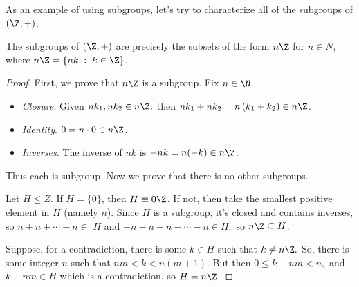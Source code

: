 As an example of using subgroups, let's try to characterize all of the subgroups of $(\Z, +)$.

\begin{theorem}[Subgroups of $\Z$]\label{thm:subgroups-of-z}
	The subgroups of $(\Z, +)$ are precisely the subsets of the form $n \Z$ for $n \in N$, where $n\Z = \{n k \; : \; k \in \Z\}$.
\end{theorem}
\begin{proof}
	First, we prove that $n \Z$ is a subgroup. Fix $n \in \N$.
	\begin{itemize}
		\item \emph{Closure}. Given $n k_{1}, n k_{2} \in n \Z,$ then $n k_{1}+n k_{2}=n\left(k_{1}+k_{2}\right) \in n \Z$.
		\item \emph{Identity}. $0 =n \cdot 0 \in n \Z$.
		\item \emph{Inverses}. The inverse of $n k$ is $-n k=n(-k) \in n \Z$.
	\end{itemize}
Thus each is subgroup. Now we prove that there is no other subgroups.

Let $H \leq Z$. If $H=\{0\}$, then $H \equiv 0 \Z$. If not, then take the smallest positive element in $H$ (namely $n$). Since $H$ is a subgroup, it's closed and contains inverses, so $n+n+\cdots+n \in$ $H$ and $-n-n-n-\cdots-n \in H,$ so $n \Z \subseteq H$.

Suppose, for a contradiction, there is some $k \in H$ such that $k \neq n \Z .$ So, there is some integer $n$ such that $n m<k<n(m+1) .$ But then $0 \leq k-n m<n,$ and $k-n m \in H$ which is a contradiction, so $H=n \Z$.
\end{proof}

